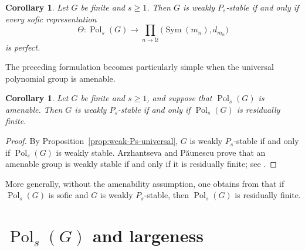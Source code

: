\documentclass[a4paper,12pt]{amsart}
\theoremstyle{plain}
\newtheorem{corollary}[subsection]{{\bf Corollary}}
\theoremstyle{definition}
\theoremstyle{remark}
\numberwithin{equation}{subsection}
\DeclareMathOperator{\Sym}{Sym}
\DeclareMathOperator{\Pold}{Pol}
\begin{document}
\begin{corollary}
\label{cor:weak-Ps-sofic-representations}
Let $G$ be finite and $s\geq1$.  Then $G$ is weakly $P_s$-stable if
and only if every sofic representation
$$\Theta:
\Pold_s(G)\longrightarrow
\prod_{n\to\mathcal U}
\bigl(\Sym(m_n),d_{m_n}\bigr)$$
is perfect.
\end{corollary}




The preceding formulation becomes particularly simple when the
universal polynomial group is amenable.

\begin{corollary}
\label{cor:weak-Ps-amenable}
Let $G$ be finite and $s\geq1$, and suppose that $\Pold_s(G)$ is
amenable.  Then
$G$ is weakly $P_s$-stable if and only if
$\Pold_s(G)$ is residually finite.
\end{corollary}

\begin{proof}
By Proposition~\ref{prop:weak-Ps-universal}, $G$ is weakly
$P_s$-stable if and only if $\Pold_s(G)$ is weakly stable.
Arzhantseva and P\u{a}unescu prove that an amenable group is weakly
stable if and only if it is residually finite; see
\cite[Theorem~7.2(iii)]{AP15}.
\end{proof}
More generally, without the amenability assumption, one obtains from
\cite[Theorem~7.2(ii)]{AP15} that if
$\Pold_s(G)$ is sofic and $G$ is weakly $P_s$-stable, then
$\Pold_s(G)$ is residually finite.


\section{$\Pold_s(G)$ and largeness}
\label{s:poldfinite}
\end{document}
